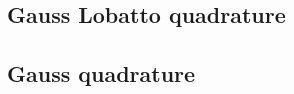 \documentclass{svjour3}                     %
\begin{document}
\subsection{Gauss Lobatto quadrature}

\subsection{Gauss quadrature}



\end{document}
